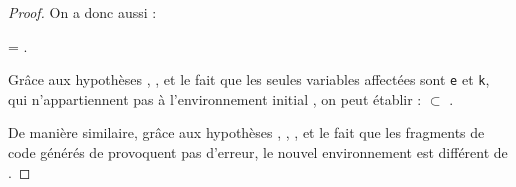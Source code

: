 \begin{proof}
  On a donc aussi :

   =
  .

  Grâce aux hypothèses , ,  et le fait que
  les seules variables affectées sont \lstinline'e' et \lstinline'k', qui
  n'appartiennent pas à l'environnement initial \env, on peut établir :
  \env $\subset$ .

  De manière similaire, grâce aux hypothèses , ,
  , et le fait que les fragments de code générés de provoquent pas
  d'erreur, le nouvel environnement est différent de \errorenv.
\end{proof}



\newpage

